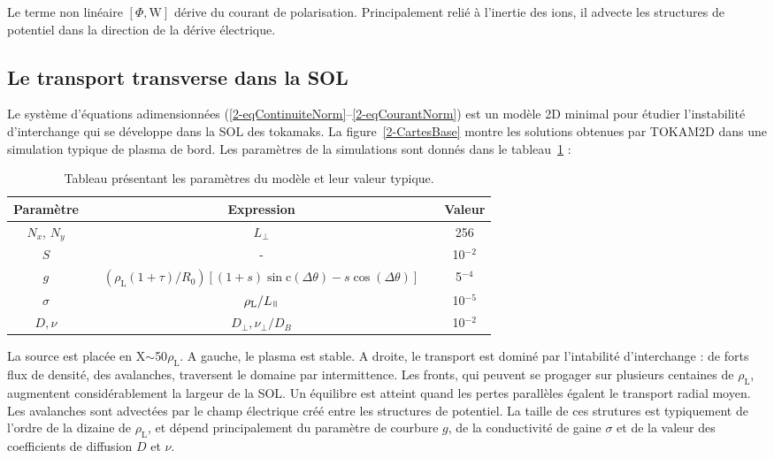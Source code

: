 \begin{refsection}
 Le terme non linéaire $[\Phi,\text{W}]$ dérive du courant de polarisation.
 Principalement relié à l'inertie des ions, il advecte les structures de
 potentiel dans la direction de la dérive électrique.
 

\subsection{Le transport transverse dans la SOL}

Le système d'équations
adimensionnées (\eqref{2-eqContinuiteNorm}--\eqref{2-eqCourantNorm}) est un
modèle 2D minimal pour étudier l'instabilité d'interchange qui se développe dans
la SOL des tokamaks. La figure~\ref{2-CartesBase} montre les solutions obtenues
par TOKAM2D dans une simulation typique de plasma de bord. Les paramètres de la
simulations sont donnés dans le tableau~\ref{2-TokamParam} :
\begin{table}[!htbp]
\footnotesize\centering
{}
\begin{tabular}{@{}ccccc@{}}\toprule
Paramètre&&Expression&&Valeur\\
\midrule 
$N_x$, $N_y$ && $L_\perp$ && 256\\
$S$ && - && 10$^{-2}$\\
$g$ &&
$(\rho_\text{L}(1+\tau)/R_0)[(1+s)\sin\text{c}(\Delta\theta)
-s\cos(\Delta\theta)]$ && 5$^{-4}$\\
$\sigma$ &&
$\rho_\text{L}/L_\para$ &&
10$^{-5}$\\
$D,\nu$ &&
$D_\perp,\nu_\perp/D_B$ &&
10$^{-2}$\\
\bottomrule
\end{tabular}
\caption{Tableau présentant les paramètres du modèle et
leur valeur typique.}\label{2-TokamParam}
\end{table}

La source est placée en X$\sim$50$\rho_\text{L}$. A gauche, le plasma est
stable. A droite, le transport est dominé par l'intabilité d'interchange : de
forts flux de densité, des avalanches, traversent le domaine par intermittence.
Les fronts, qui peuvent se progager sur plusieurs centaines de
$\rho_\text{L}$, augmentent considérablement la largeur de la SOL.
Un équilibre est atteint quand les pertes parallèles égalent le transport
radial moyen.
Les avalanches sont advectées par le champ électrique créé entre les structures
de potentiel. La taille de ces strutures est typiquement de l'ordre de la
dizaine de $\rho_\text{L}$, et dépend principalement 
du paramètre de courbure $g$, de la conductivité de gaine $\sigma$ et de la
valeur des coefficients de diffusion $D$ et $\nu$.


\end{refsection}
